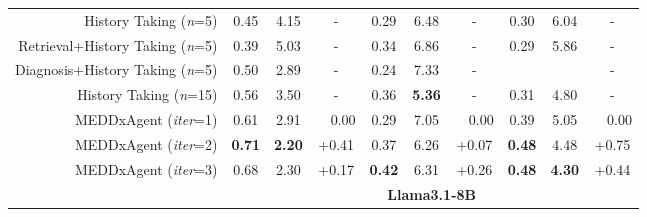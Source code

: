 \begin{table*}[ht]
\begin{tabular}{rccccccccc}
History Taking (\textit{n}=5)         & 0.45           & 4.15    &  - & 0.29        & 6.48   &     -   & 0.30         & 6.04      &   -  \\
Retrieval+History Taking (\textit{n}=5)  &      0.39      & 5.03   &  -  &  0.34  &  6.86       & -  &     0.29   &   5.86 &    -   \\
Diagnosis+History Taking (\textit{n}=5)  &     0.50      &  2.89 &  -  & 0.24 &    7.33   & -  &       &    &    -   \\
History Taking (\textit{n}=15)        & 0.56           & 3.50      &- & 0.36        & \textbf{5.36}       &  -  & 0.31         & 4.80    &    -   \\\cmidrule(lr){2-10}
MEDDxAgent (\textit{iter}=1)                       & 0.61           & 2.91    & ~~0.00  & 0.29        & 7.05       & ~~0.00   & 0.39         & 5.05   &     ~~0.00   \\
MEDDxAgent (\textit{iter}=2)                       & \textbf{0.71}   & \textbf{2.20}      & +0.41 & 0.37        & 6.26      & +0.07   & \textbf{0.48}         & 4.48  &    +0.75     \\
MEDDxAgent (\textit{iter}=3)                       & 0.68   & 2.30    & +0.17  & \textbf{0.42}        & 6.31     &   +0.26   & \textbf{0.48}         & \textbf{4.30}      &   +0.44  \\\midrule
                               & \multicolumn{9}{c}{\textbf{Llama3.1-8B}}                                                            \\\midrule

\end{tabular}
\end{table*}
